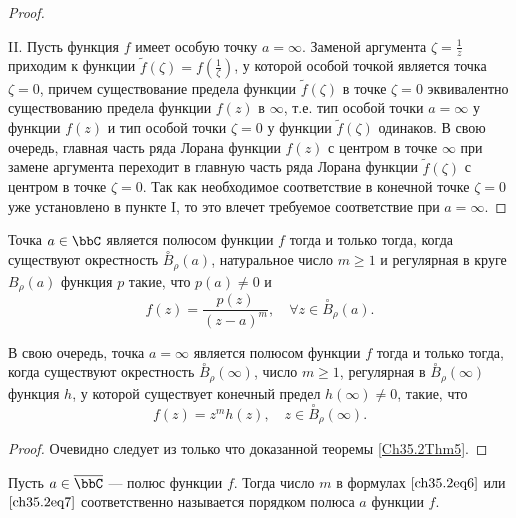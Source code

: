 \begin{proof}
\begin{enumerate}
\end{enumerate}

II. Пусть функция $f$ имеет особую точку $a = \infty$. Заменой аргумента $\zeta = \frac{1}{z}$ приходим к функции $\widetilde{f}(\zeta) = f(\frac{1}{\zeta})$, у которой особой точкой является точка $\zeta = 0$, причем существование предела функции $\widetilde{f}(\zeta)$ в точке $\zeta = 0$ эквивалентно существованию предела функции $f(z)$ в $\infty$, т.е. тип особой точки $a = \infty$ у функции $f(z)$ и тип особой точки $\zeta = 0$ у функции $\widetilde{f}(\zeta)$ одинаков. В свою очередь, главная часть ряда Лорана функции $f(z)$ с центром в точке $\infty$ при замене аргумента переходит в главную часть ряда Лорана функции $\widetilde{f}(\zeta)$ с центром в точке $\zeta = 0$. Так как необходимое соответствие в конечной точке $\zeta = 0$ уже установлено в пункте I, то это влечет требуемое соответствие при $a  =\infty$.

\end{proof}

\begin{cons} \label{ch35.2cons1}
Точка $a \in \bbC$ является полюсом функции $f$ тогда и только тогда, когда существуют окрестность $\overset{\circ}{B}_\rho(a)$, натуральное число $m \ge 1$ и регулярная в круге $B_\rho(a)$ функция $p$ такие, что $p(a) \not = 0$ и
\begin{equation} \label{ch35.2eq6}
f(z) = \frac{p(z)}{(z - a)^m}, \quad \forall z \in \overset{\circ}{B}_\rho(a).
\end{equation}

В свою очередь, точка $a = \infty$ является полюсом функции $f$ тогда и только тогда, когда существуют окрестность $\overset{\circ}{B}_\rho(\infty)$, число $m \ge 1$, регулярная в $\overset{\circ}{B}_\rho(\infty)$ функция $h$, у которой существует конечный предел $h(\infty) \not= 0$, такие, что
\begin{equation} \label{ch35.2eq7}
f(z) = z^m h(z), \quad z \in \overset{\circ}{B}_\rho(\infty).
\end{equation}

\end{cons}

\begin{proof}
Очевидно следует из только что доказанной теоремы \ref{Ch35.2Thm5}.
\end{proof}

\begin{defn}
Пусть $a \in \overline{\bbC}$ --- полюс функции $f$. Тогда число $m$ в формулах $\eqref{ch35.2eq6}$ или $\eqref{ch35.2eq7}$ соответственно называется порядком полюса $a$ функции $f$.
\end{defn}

